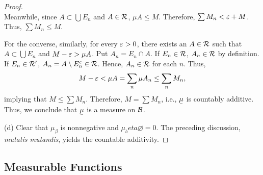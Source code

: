 \begin{proof}
\[    \]
    Meanwhile, since $A\subset\bigcup E_n$ and $A\in\mathcal{R}$, $\mu A\le M$. 
    Therefore, $\sum M_n<\varepsilon+M$. Thus, $\sum M_n\le M$.\par
    For the converse, similarly, for every $\varepsilon>0$, there exists an $A\in
    \mathcal{R}$ such that $A\subset\bigcup E_n$ and $M-\varepsilon>\mu A$. Put $A_n=E_n
    \cap A$. If $E_n\in\mathcal{R}$, $A_n\in\mathcal{R}$ by definition. If $E_n\in
    \mathcal{R}^\prime$, $A_n=A\setminus E_n^c\in\mathcal{R}$. Hence, $A_n\in\mathcal{R}$
    for each $n$. Thus,
    \[
      M-\varepsilon<\mu A=\sum_n\mu A_n\le\sum_n M_n,
    \]
    implying that $M\le \sum M_n$. Therefore, $M=\sum M_n$, i.e., $\ubar{\mu}$ 
    is countably additive. Thus, we conclude that $\ubar{\mu}$ is a measure on
    $\mathcal{B}$.\par
    (d) Clear that $\mu_\beta$ is nonnegative and $\mu_beta\varnothing=0$. The
    preceding discussion, \textit{mutatis mutandis}, yields the countable 
    additivity.
  \end{proof}
\subsection{Measurable Functions}
